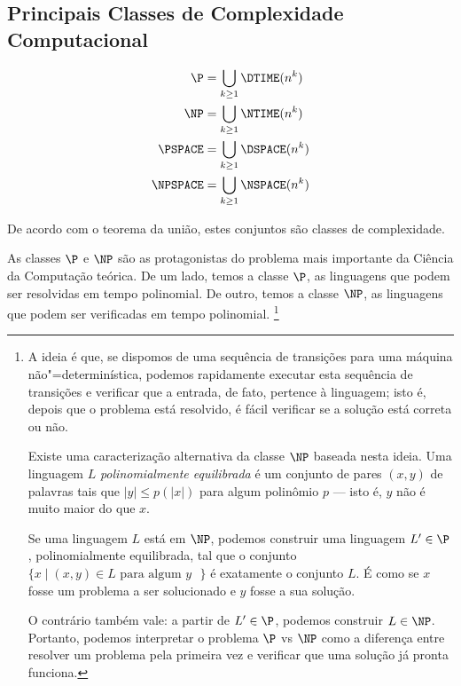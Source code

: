 \subsection{Principais Classes de Complexidade Computacional}
\label{sec:standard_classes}

\begin{definition}
    \begin{align*}
        \P &= \bigcup_{k \geq 1} \DTIME(n^k) \\
        \NP &= \bigcup_{k \geq 1} \NTIME(n^k) \\
        \PSPACE &= \bigcup_{k \geq 1} \DSPACE(n^k) \\
        \NPSPACE &= \bigcup_{k \geq 1} \NSPACE(n^k) \\
    \end{align*}
\end{definition}

De acordo com o teorema da união,
estes conjuntos são classes de complexidade.

As classes $\P$ e $\NP$ são as protagonistas
do problema mais importante da Ciência da Computação teórica.
De um lado, temos a classe $\P$,
as linguagens que podem ser resolvidas em tempo polinomial.
De outro, temos a classe $\NP$,
as linguagens que podem ser verificadas em tempo polinomial.%
\footnote{
    \label{foot:polinomially_balanced}
    A ideia é que,
    se dispomos de uma sequência de transições para uma máquina não"=determinística,
    podemos rapidamente executar esta sequência de transições
    e verificar que a entrada, de fato, pertence à linguagem;
    isto é, depois que o problema está resolvido,
    é fácil verificar se a solução está correta ou não.

    Existe uma caracterização alternativa da classe $\NP$ baseada nesta ideia.
    Uma linguagem $L$ \emph{polinomialmente equilibrada}
    é um conjunto de pares $(x, y)$ de palavras
    tais que $|y| \leq p(|x|)$ para algum polinômio $p$
    \cite[p.~298]{Papadimitriou1998}
    --- isto é, $y$ não é muito maior do que $x$.

    Se uma linguagem $L$ está em $\NP$,
    podemos construir uma linguagem $L' \in \P$,
    polinomialmente equilibrada,
    tal que o conjunto $\{x \mid (x, y) \in L \text{ para algum $y$ }\}$
    é exatamente o conjunto $L$.
    É como se $x$ fosse um problema a ser solucionado
    e $y$ fosse a sua solução.

    O contrário também vale: a partir de $L' \in \P$,
    podemos construir $L \in \NP$.
    Portanto, podemos interpretar o problema $\P$ vs $\NP$
    como a diferença entre resolver um problema pela primeira vez
    e verificar que uma solução já pronta funciona.
}

